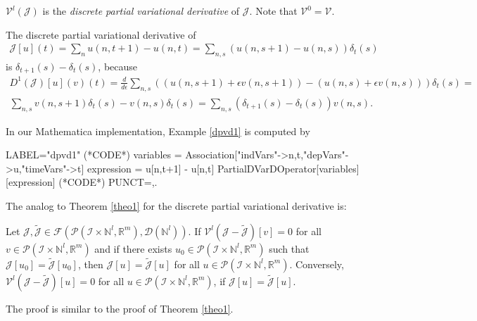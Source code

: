\documentclass[runningheads]{llncs}
\newcommand{\Rr}{\mathbb{R}}
\newcommand{\Nn}{\mathbb{N}}
\newcommand{\1}{\chi}
\newcommand{\Ii}{\mathcal{I}}
\begin{document}
\normalsize
\begin{definition}
$\mathcal{V}^l(\mathcal{J})$ is the \emph{discrete partial variational derivative} of $\mathcal{J}$.
	Note that $\mathcal{V}^0=\mathcal{V}$.
\end{definition}
\begin{example}
	\label{dpvd1}
	The discrete partial variational derivative of 
	\begin{gather*}
		\mathcal{J}[u](t)=\sum_nu(n,t+1)-u(n,t)=\sum_{n,s}(u(n,s+1)-u(n,s))\delta_t(s)
	\end{gather*}
	is $\delta_{t+1}(s)-\delta_t(s)$, because
	\small
	\begin{gather*}
		D^1(\mathcal{J})[u](v)(t)
		=\frac{d}{d\epsilon} \sum_{n,s}((u(n,s+1)+\epsilon v(n,s+1))-(u(n,s)+\epsilon v(n,s)))\delta_t(s)=\\
		\sum_{n,s}v(n,s+1)\delta_t(s)-v(n,s)\delta_t(s)%
		=\sum_{n,s}(\delta_{t+1}(s)-\delta_t(s))v(n,s).%
	\end{gather*}
	\normalsize
\end{example}
\begin{example}
	In our {\sc Mathematica} implementation, Example \ref{dpvd1} is computed by
	\begin{EXE}
		LABEL="dpvd1"
		(*CODE*)
		variables = Association["indVars"->{n,t},"depVars"->{u},"timeVars"->{t}]
		expression = u[n,t+1] - u[n,t]
		PartialDVarDOperator[variables][expression]
		(*CODE*)
		PUNCT={,.}
	\end{EXE}	
	\begin{small}
		
		
	\end{small}
\end{example}
The analog to Theorem \ref{theo1} for the discrete partial variational derivative is:
\begin{theorem}\label{theo2}
	Let $\mathcal{J},\tilde{\mathcal{J}}\in \mathcal{F}(\mathcal{P}(\Ii\times\Nn^l,\Rr^m),\mathcal{D}(\Nn^l))$. If $\mathcal{V}^l(\mathcal{J}-\tilde{\mathcal{J}})[v]=0$ for all $v\in\mathcal{P}(\Ii\times\Nn^l,\Rr^m)$ and if there exists $u_0\in\mathcal{P}(\Ii\times\Nn^l,\Rr^m)$ such that $\mathcal{J}[u_0]=\tilde{\mathcal{J}}[u_0]$, then
	$\mathcal{J}[u]=\tilde{\mathcal{J}}[u]$
	for all $u\in\mathcal{P}(\Ii\times\Nn^l,\Rr^m)$.
	Conversely,
	$\mathcal{V}^l(\mathcal{J}-\tilde{\mathcal{J}})[u]=0$
	for all $u\in\mathcal{P}(\Ii\times\Nn^l,\Rr^m)$, if $\mathcal{J}[u]=\tilde{\mathcal{J}}[u]$.
\end{theorem}
The proof is similar to the proof of Theorem \ref{theo1}.
\end{document}
